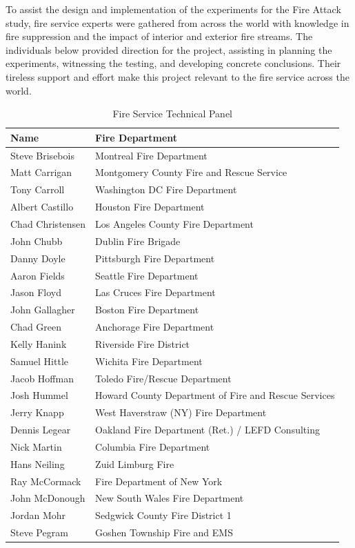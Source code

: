 \documentclass[12pt,oneside]{book}
\begin{document}
\clearpage

To assist the design and implementation of the experiments for the Fire Attack study, fire service experts were gathered from across the world with knowledge in fire suppression and the impact of interior and exterior fire streams. The individuals below provided direction for the project, assisting in planning the experiments, witnessing the testing, and developing concrete conclusions. Their tireless support and effort make this project relevant to the fire service across the world. 

\begin{table}[!ht]
	\centering
	\caption*{Fire Service Technical Panel}
	\begin{tabular}{|l|l|}
		\hline
		Name & Fire Department \\ 
		\hline \hline
		Steve Brisebois  & Montreal Fire Department \\ \hline
		Matt Carrigan    & Montgomery County Fire and Rescue Service \\ \hline
		Tony Carroll     & Washington DC Fire Department \\ \hline
		Albert Castillo  & Houston Fire Department \\ \hline
		Chad Christensen & Los Angeles County Fire Department \\ \hline
		John Chubb       & Dublin Fire Brigade \\ \hline	 		  
		Danny Doyle      & Pittsburgh Fire Department \\ \hline
		Aaron Fields     & Seattle Fire Department \\ \hline
		Jason Floyd      & Las Cruces Fire Department \\ \hline
		John Gallagher   & Boston Fire Department \\ \hline
		Chad Green       & Anchorage Fire Department \\ \hline
		Kelly Hanink     & Riverside Fire District \\ \hline
		Samuel Hittle    & Wichita Fire Department \\ \hline
		Jacob Hoffman    & Toledo Fire/Rescue Department \\ \hline
		Josh Hummel      & Howard County Department of Fire and Rescue Services \\ \hline
		Jerry Knapp      & West Haverstraw (NY) Fire Department \\ \hline
		Dennis Legear    & Oakland Fire Department (Ret.) / LEFD Consulting \\ \hline
		Nick Martin      & Columbia Fire Department \\ \hline
		Hans Neiling     & Zuid Limburg Fire \\ \hline
		Ray McCormack    & Fire Department of New York \\ \hline
		John McDonough   & New South Wales Fire Department \\ \hline
		Jordan Mohr      & Sedgwick County Fire District 1 \\ \hline
		Steve Pegram     & Goshen Township Fire and EMS \\ \hline
	\end{tabular}
\end{table}
\end{document}
